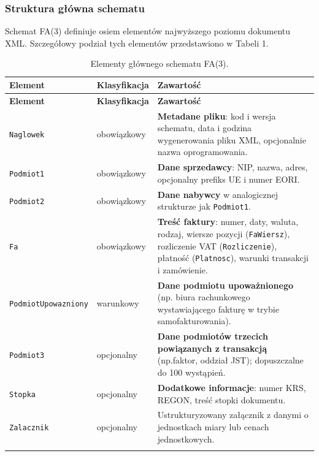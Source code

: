\subsubsection{Struktura główna schematu}
\label{sec:ksef-fa3-struktura}

Schemat FA(3) definiuje osiem elementów najwyższego poziomu dokumentu XML. \cite{ksef-fa3-infosheet} Szczegółowy podział tych elementów przedstawiono w Tabeli 1.

\begin{xltabular}{\linewidth}{l l X}
    \toprule
    \textbf{Element} & \textbf{Klasyfikacja} & \textbf{Zawartość} \\
    \midrule
    \endfirsthead
    \toprule
    \textbf{Element} & \textbf{Klasyfikacja} & \textbf{Zawartość} \\
    \midrule
    \endhead
    \bottomrule
    \endfoot
    \bottomrule
    \endlastfoot
    \texttt{Naglowek} & obowiązkowy   & \textbf{Metadane pliku}: kod i wersja schematu, data i godzina wygenerowania pliku XML, opcjonalnie nazwa oprogramowania. \\
    \texttt{Podmiot1}           & obowiązkowy   & \textbf{Dane sprzedawcy}: NIP, nazwa, adres, opcjonalny prefiks UE i numer EORI. \\
    \texttt{Podmiot2}           & obowiązkowy   & \textbf{Dane nabywcy} w analogicznej strukturze jak \texttt{Podmiot1}. \\
    \texttt{Fa}                 & obowiązkowy   & \textbf{Treść faktury}: numer, daty, waluta, rodzaj, wiersze pozycji (\texttt{FaWiersz}), rozliczenie VAT (\texttt{Rozliczenie}), płatność (\texttt{Platnosc}), warunki transakcji i zamówienie. \\
    \texttt{PodmiotUpowazniony} & warunkowy     & \textbf{Dane podmiotu upoważnionego} (np. biura rachunkowego wystawiającego fakturę w trybie samofakturowania). \\
    \texttt{Podmiot3}           & opcjonalny    & \textbf{Dane podmiotów trzecich powiązanych z transakcją} (np.faktor, oddział JST); dopuszczalne do 100 wystąpień. \\
    \texttt{Stopka}             & opcjonalny    & \textbf{Dodatkowe informacje}: numer KRS, REGON, treść stopki dokumentu. \\
    \texttt{Zalacznik}          & opcjonalny    & Ustrukturyzowany załącznik z danymi o jednostkach miary lub cenach jednostkowych. \\
	\caption{Elementy głównego schematu FA(3).} \label{tab:fa3-elementy} \\
\end{xltabular}

